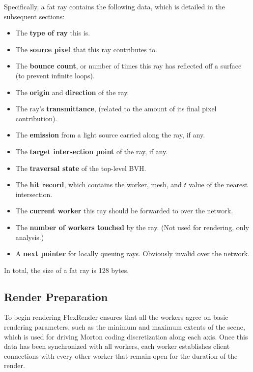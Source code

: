 \documentclass[a4paper,twoside]{article}
\begin{document}
Specifically, a fat ray contains the following data, which is detailed in the subsequent sections:

\begin{itemize}
    \item The \textbf{type of ray} this is. %
    \item The \textbf{source pixel} that this ray contributes to.
    \item The \textbf{bounce count}, or number of times this ray has reflected
        off a surface (to prevent infinite loops).
    \item The \textbf{origin} and \textbf{direction} of the ray.
    \item The ray's \textbf{transmittance}, (related to the amount of its final
        pixel contribution).
    \item The \textbf{emission} from a light source carried along the ray, if
        any. %
    \item The \textbf{target intersection point} of the ray, if any. %
    \item The \textbf{traversal state} of the top-level BVH. %
    \item The \textbf{hit record}, which contains the worker, mesh, and $t$
        value of the nearest intersection.
    \item The \textbf{current worker} this ray should be forwarded to over the
        network.
    \item The \textbf{number of workers touched} by the ray. (Not
        used for rendering, only analysis.)
    \item A \textbf{next pointer} for locally queuing rays. Obviously invalid
        over the network. %
\end{itemize}

In total, the size of a fat ray is 128 bytes.

\subsection{Render Preparation}
\label{prep}

To begin rendering FlexRender ensures that all the workers agree on basic rendering
parameters, such as the minimum and maximum extents of the scene, which is used
for driving Morton coding discretization along each axis. Once this data has
been synchronized with all workers, each worker establishes client connections
with every other worker that remain open for the duration of the render.
\end{document}
